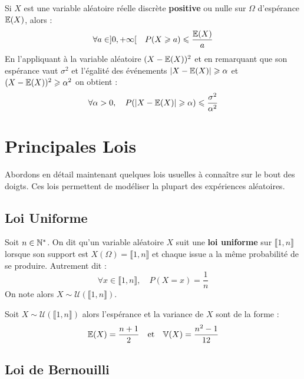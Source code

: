 \begin{theorem}
    Si $X$ est une variable aléatoire réelle discrète \textbf{positive} ou nulle sur $\Omega$ d'espérance $\mathbb{E}(X)$, alors :
        \[ \forall a \in ]0, + \infty [ \quad P(X \geqslant a) \leqslant \dfrac{\mathbb{E}(X)}{a} \]
    En l'appliquant à la variable aléatoire $(X - \mathbb{E}(X))^2$ et en remarquant que son espérance vaut $\sigma^2$ et l'égalité des événements $|X - \mathbb{E}(X)| \geqslant \alpha$ et $(X - \mathbb{E}(X))^2 \geqslant \alpha^2 $ on obtient :
        \[ \forall \alpha > 0, \quad P(|X - \mathbb{E}(X)| \geqslant \alpha) \leqslant \dfrac{\sigma^2}{\alpha^2}\]
\end{theorem}


\section{Principales Lois}

Abordons en détail maintenant quelques lois usuelles à connaître sur le bout des doigts. 
Ces lois permettent de modéliser la plupart des expériences aléatoires. 

\subsection{Loi Uniforme}

\begin{definition}
    Soit $n \in \mathbb{N}^*$. On dit qu'un variable aléatoire $X$ suit une \textbf{loi uniforme} sur $ \llbracket 1, n \rrbracket $ 
    lorsque son support est $X(\Omega) = \llbracket 1, n \rrbracket $ et chaque issue a la même probabilité de se produire. 
    Autrement dit : 
        \[ \forall x \in \llbracket 1, n \rrbracket, \quad P(X = x) = \frac{1}{n} \]
    On note alors $X \sim \mathcal{U}(\llbracket 1, n \rrbracket)$. 
\end{definition}

\begin{proposition}
    Soit $X \sim \mathcal{U}(\llbracket 1, n \rrbracket)$ alors l'espérance et la variance de $X$ sont de la forme : 
        \[ \mathbb{E}(X) = \frac{n+1}{2} \quad \text{et} \quad \mathbb{V}(X) = \frac{n^2-1}{12}  \] 
\end{proposition}

\subsection{Loi de Bernouilli}

